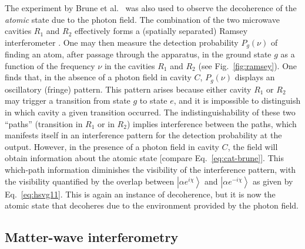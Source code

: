\documentclass[3p,sort&compress,12pt]{elsarticle}
\newcommand{\ket}[1]{\left\vert{#1}\right\rangle}
\newcommand{\E}{\ensuremath{e}}
\newcommand{\I}{\ensuremath{i}}
\begin{document}
The experiment by Brune et al.\ \cite{Brune:1996:om} was also used to observe the decoherence of the \emph{atomic} state due to the photon field. The combination of the two microwave cavities $R_1$ and $R_2$ effectively forms a (spatially separated) Ramsey interferometer \cite{Ramsey:1950:pp,Haroche:2006:hh}. One may then measure the detection probability $P_g(\nu)$ of finding an atom, after passage through the apparatus, in the ground state $g$ as a function of the frequency $\nu$ in the cavities $R_1$ and $R_2$ (see Fig.~\ref{fig:ramsey}). One finds that, in the absence of a photon field in cavity $C$, $P_g(\nu)$ displays an oscillatory (fringe) pattern. This pattern arises because either cavity $R_1$ or $R_2$ may trigger a transition from state $g$ to state $e$, and it is impossible to distinguish in which cavity a given transition occurred. The indistinguishability of these two ``paths'' (transition in $R_1$ or in $R_2$) implies interference between the paths, which manifests itself in an interference pattern for the detection probability at the output. However, in the presence of a photon field in cavity $C$, the field will obtain information about the atomic state [compare Eq.~\eqref{eq:cat-brune}]. This which-path information diminishes the visibility of the interference pattern, with the visibility quantified by the overlap between $\ket{\alpha \E^{\I \chi}}$ and $\ket{\alpha \E^{-\I \chi}}$ as given by Eq.~\eqref{eq:hsvg11}. This is again an instance of decoherence, but it is now the atomic state that decoheres due to the environment provided by the photon field. 


\subsection{\label{sec:matt-wave-interf}Matter-wave interferometry}
\end{document}
